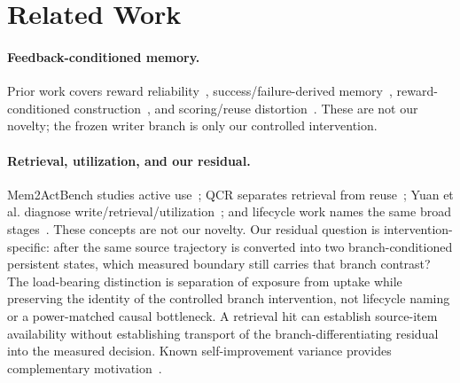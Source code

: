 \section{Related Work}
\paragraph{Feedback-conditioned memory.} Prior work covers reward reliability~\citep{wang2026planrewardbench}, success/failure-derived memory~\citep{ouyang2026reasoningbank}, reward-conditioned construction~\citep{wang2025memalpha}, and scoring/reuse distortion~\citep{asadolahi2026inflation,yang2026romerl}. These are not our novelty; the frozen writer branch is only our controlled intervention.

\paragraph{Retrieval, utilization, and our residual.} Mem2ActBench studies active use~\citep{shen2026mem2actbench}; QCR separates retrieval from reuse~\citep{li2026qcr}; Yuan et al. diagnose write/retrieval/utilization~\citep{yuan2026retrievalutilization}; and lifecycle work names the same broad stages~\citep{lin2026memorylifecycle}. These concepts are not our novelty. Our residual question is intervention-specific: after the same source trajectory is converted into two branch-conditioned persistent states, which measured boundary still carries that branch contrast? The load-bearing distinction is separation of exposure from uptake while preserving the identity of the controlled branch intervention, not lifecycle naming or a power-matched causal bottleneck. A retrieval hit can establish source-item availability without establishing transport of the branch-differentiating residual into the measured decision. Known self-improvement variance provides complementary motivation~\citep{ye2026fragility}.
